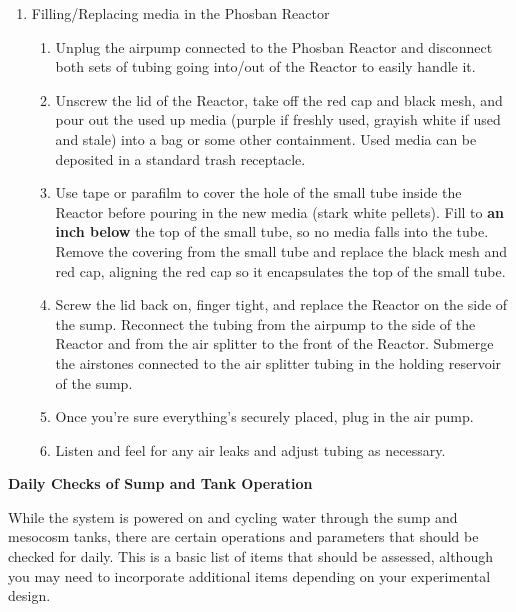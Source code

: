 \documentclass[
]{book}
\providecommand{\tightlist}{%
  \setlength{\itemsep}{0pt}\setlength{\parskip}{0pt}}
\begin{document}
\begin{enumerate}
\def\labelenumi{\arabic{enumi}.}
\tightlist
\item
  Filling/Replacing media in the Phosban Reactor

  \begin{enumerate}
  \def\labelenumii{\arabic{enumii}.}
  \tightlist
  \item
    Unplug the airpump connected to the Phosban Reactor and disconnect both sets of tubing going into/out of the Reactor to easily handle it.
  \item
    Unscrew the lid of the Reactor, take off the red cap and black mesh, and pour out the used up media (purple if freshly used, grayish white if used and stale) into a bag or some other containment. Used media can be deposited in a standard trash receptacle.
  \item
    Use tape or parafilm to cover the hole of the small tube inside the Reactor before pouring in the new media (stark white pellets). Fill to \textbf{an inch below} the top of the small tube, so no media falls into the tube. Remove the covering from the small tube and replace the black mesh and red cap, aligning the red cap so it encapsulates the top of the small tube.
  \item
    Screw the lid back on, finger tight, and replace the Reactor on the side of the sump. Reconnect the tubing from the airpump to the side of the Reactor and from the air splitter to the front of the Reactor. Submerge the airstones connected to the air splitter tubing in the holding reservoir of the sump.
  \item
    Once you're sure everything's securely placed, plug in the air pump.
  \item
    Listen and feel for any air leaks and adjust tubing as necessary.
  \end{enumerate}
\end{enumerate}

\textbf{Daily Checks of Sump and Tank Operation}

While the system is powered on and cycling water through the sump and mesocosm tanks, there are certain operations and parameters that should be checked for daily. This is a basic list of items that should be assessed, although you may need to incorporate additional items depending on your experimental design.
\end{document}
